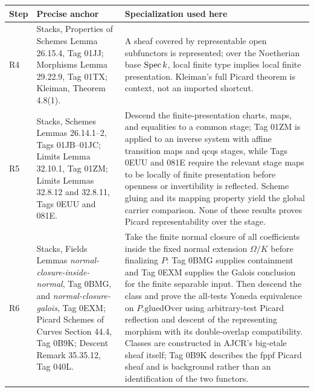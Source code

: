 \begin{center}
\begin{tabular}{p{}p{}p{}}
\textbf{Step} & \textbf{Precise anchor} & \textbf{Specialization used here}\\ \hline
R4 & Stacks, Properties of Schemes Lemma 26.15.4, Tag 01JJ; Morphisms Lemma
29.22.9, Tag 01TX; Kleiman, Theorem 4.8(1). & A sheaf covered by representable
open subfunctors is represented; over the Noetherian base \(\operatorname{Spec} k\), local
finite type implies local finite presentation.  Kleiman's full Picard theorem
is context, not an imported shortcut.\\
R5 & Stacks, Schemes Lemmas 26.14.1--2, Tags 01JB--01JC; Limits Lemma
32.10.1, Tag 01ZM; Limits Lemmas 32.8.12 and 32.8.11, Tags 0EUU and 081E. &
Descend the finite-presentation charts, maps, and equalities to a common stage;
Tag 01ZM is applied to an inverse system with affine transition maps and qcqs
stages, while Tags 0EUU and 081E require the relevant stage maps to be locally
of finite presentation before openness or invertibility is reflected.  Scheme
gluing and its mapping property yield the global carrier comparison.  None of
these results proves Picard representability over the stage.\\
R6 & Stacks, Fields Lemmas \emph{normal-closure-inside-normal}, Tag 0BMG, and
\emph{normal-closure-galois}, Tag 0EXM; Picard Schemes of Curves Section
44.4, Tag 0B9K; Descent Remark 35.35.12, Tag 040L. & Take the finite normal
closure of all coefficients inside the fixed normal extension \(\Omega/K\)
before finalizing \(P\): Tag 0BMG supplies containment and Tag 0EXM supplies the
Galois conclusion for the finite separable input.  Then descend the class and
prove the all-tests Yoneda equivalence on \(P.\mathrm{gluedOver}\) using
arbitrary-test Picard reflection and descent of the representing morphism
with its double-overlap compatibility.  Classes are constructed in AJCR's
big-etale sheaf itself; Tag 0B9K describes the fppf Picard sheaf and is
background rather than an identification of the two functors.\\
\end{tabular}
\end{center}


